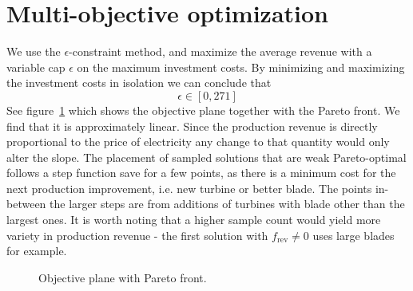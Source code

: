 \documentclass{article}
\begin{document}
\section{Multi-objective optimization}
We use the $\epsilon$\nobreakdash-constraint method,
and maximize the average revenue with
a variable cap $\epsilon$ on the maximum investment costs.
By minimizing and maximizing the investment costs in isolation
we can conclude that
$$ \epsilon \in [0, 271] $$
See figure~\ref{fig:pareto_front} which shows the objective plane
together with the Pareto front.
We find that it is approximately linear.
Since the production revenue is directly proportional to the
price of electricity any change to that quantity
would only alter the slope.
The placement of sampled solutions that are weak Pareto-optimal
follows a step function save for a few points,
as there is a minimum cost for the next production improvement,
i.e. new turbine or better blade.
The points in-between the larger steps are from additions of turbines
with blade other than the largest ones.
It is worth noting that a higher sample count would yield
more variety in production revenue -
the first solution with $f_\text{rev} \ne 0$ uses large blades for example.

\begin{figure}
	\centering
	\caption{Objective plane with Pareto front. \label{fig:pareto_front}}
\end{figure}
\end{document}
